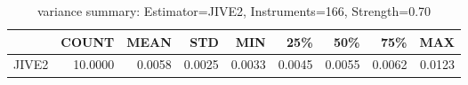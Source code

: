 \begin{table}[ht]
\centering
\caption{variance summary: Estimator=JIVE2, Instruments=166, Strength=0.70}
\begin{tabular}{lrrrrrrrr}
\toprule
 & COUNT & MEAN & STD & MIN & 25\% & 50\% & 75\% & MAX \\
\midrule
JIVE2 & 10.0000 & 0.0058 & 0.0025 & 0.0033 & 0.0045 & 0.0055 & 0.0062 & 0.0123 \\
\bottomrule
\end{tabular}
\end{table}
